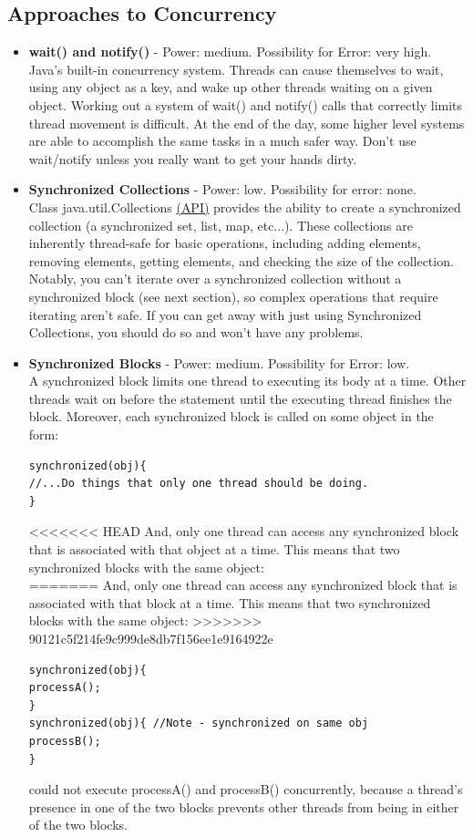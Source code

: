 \documentclass[11pt]{article}
\begin{document}
\begin{itemize}
\subsection{Approaches to Concurrency}
\begin{itemize}
\item \textbf{wait() and notify()} - Power: medium. Possibility for Error: very high.\\
Java's built-in concurrency system. Threads can cause themselves to wait, using any object as a key, and wake up other threads waiting on a given object. Working out a system of wait() and notify() calls that correctly limits thread movement is difficult. At the end of the day, some higher level systems are able to accomplish the same tasks in a much safer way. Don't use wait/notify unless you really want to get your hands dirty.
\item \textbf{Synchronized Collections} - Power: low. Possibility for error: none. \\
Class java.util.Collections \href{http://docs.oracle.com/javase/7/docs/api/java/util/Collections.html\#synchronizedCollection(java.util.Collection)}{({\color{blue}\underline{API}})} provides the ability to create a synchronized collection (a synchronized set, list, map, etc...). These collections are inherently thread-safe for basic operations, including adding elements, removing elements, getting elements, and checking the size of the collection. Notably, you can't iterate over a synchronized collection without a synchronized block (see next section), so complex operations that require iterating aren't safe. If you can get away with just using Synchronized Collections, you should do so and won't have any problems.
\item \textbf{Synchronized Blocks} - Power: medium. Possibility for Error: low.\\
A synchronized block limits one thread to executing its body at a time. Other threads wait on before the statement until the executing thread finishes the block. Moreover, each synchronized block is called on some object in the form:
\begin{lstlisting}[frame=single]
synchronized(obj){
//...Do things that only one thread should be doing.
}
\end{lstlisting}
<<<<<<< HEAD
And, only one thread can access any synchronized block that is associated with that object at a time. This means that two synchronized blocks with the same object:\\
=======
And, only one thread can access any synchronized block that is associated with that block at a time. This means that two synchronized blocks with the same object:
>>>>>>> 90121c5f214fe9c999de8db7f156ee1e9164922e
\begin{lstlisting}[frame=single]
synchronized(obj){
processA();
}
synchronized(obj){ //Note - synchronized on same obj
processB();
}
\end{lstlisting}
could not execute processA() and processB()  concurrently, because a thread's presence in one of the two blocks prevents other threads from being in either of the two blocks.\\


\end{itemize}
\end{itemize}
\end{document}
